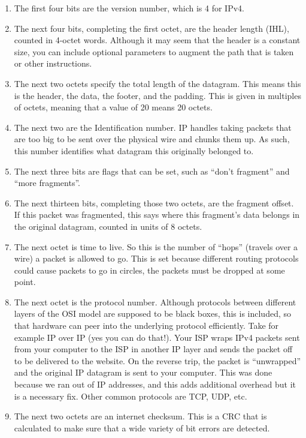 \begin{enumerate}
  \item The first four bits are the version number, which is 4 for IPv4.
  \item The next four bits, completing the first octet, are the header length (IHL), counted in 4-octet words.
    Although it may seem that the header is a constant size, you can include optional parameters to augment the path that is taken or other instructions.
  \item The next two octets specify the total length of the datagram.
    This means this is the header, the data, the footer, and the padding.
    This is given in multiples of octets, meaning that a value of 20 means 20 octets.
  \item The next two are the Identification number.
    IP handles taking packets that are too big to be sent over the physical wire and chunks them up.
    As such, this number identifies what datagram this originally belonged to.
  \item The next three bits are flags that can be set, such as ``don't fragment'' and ``more fragments''.
  \item The next thirteen bits, completing those two octets, are the fragment offset.
    If this packet was fragmented, this says where this fragment's data belongs in the original datagram, counted in units of 8 octets.
  \item The next octet is time to live.
    So this is the number of ``hops'' (travels over a wire) a packet is allowed to go.
    This is set because different routing protocols could cause packets to go in circles, the packets must be dropped at some point.
  \item The next octet is the protocol number.
    Although protocols between different layers of the OSI model are supposed to be black boxes, this is included, so that hardware can peer into the underlying protocol efficiently.
    Take for example IP over IP (yes you can do that!).
    Your ISP wraps IPv4 packets sent from your computer to the ISP in another IP layer and sends the packet off to be delivered to the website.
    On the reverse trip, the packet is ``unwrapped'' and the original IP datagram is sent to your computer.
    This was done because we ran out of IP addresses, and this adds additional overhead but it is a necessary fix.
    Other common protocols are TCP, UDP, etc.
  \item The next two octets are an internet checksum.
    This is a CRC that is calculated to make sure that a wide variety of bit errors are detected.

\end{enumerate}
